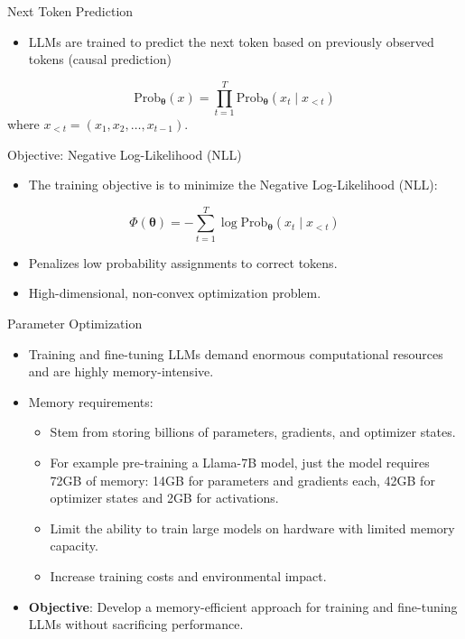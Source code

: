 \documentclass{beamer}
\begin{document}
\begin{frame}{Next Token Prediction}
    \begin{itemize}
        \item LLMs are trained to predict the next token based on previously observed tokens (causal prediction)
    \end{itemize}
    \begin{equation}
        \text{Prob}_{\mathbf{\theta}}(x) = \prod_{t=1}^{T} \text{Prob}_{\mathbf{\theta}}(x_t \mid x_{<t})
    \end{equation}
    where \( x_{<t} = (x_1, x_2, \dots, x_{t-1}) \).
\end{frame}

\begin{frame}{Objective: Negative Log-Likelihood (NLL)}
    \begin{itemize}
        \item The training objective is to minimize the Negative Log-Likelihood (NLL):
    \end{itemize}
    \begin{equation}
        \Phi(\mathbf{\theta}) = -\sum_{t=1}^{T} \log \text{Prob}_{\mathbf{\theta}}(x_t \mid x_{<t})
        \label{eq:cross_entropy_loss}
    \end{equation}
    \begin{itemize}
        \item Penalizes low probability assignments to correct tokens.
        \item High-dimensional, non-convex optimization problem.
    \end{itemize}
\end{frame}

\begin{frame}{Parameter Optimization}
    \begin{itemize}
        \item Training and fine-tuning LLMs demand enormous computational resources and are highly memory-intensive.
        \item Memory requirements: 
        \begin{itemize}
            \item Stem from storing billions of parameters, gradients, and optimizer states.
            \item For example pre-training a Llama-7B model, just the model requires 72GB of memory: 14GB for parameters and gradients each, 42GB for optimizer states and 2GB for activations. 
            \item Limit the ability to train large models on hardware with limited memory capacity.
            \item Increase training costs and environmental impact.
        \end{itemize}
        \item \textbf{Objective}: Develop a memory-efficient approach for training and fine-tuning LLMs without sacrificing performance.
    \end{itemize}
\end{frame}
\end{document}
